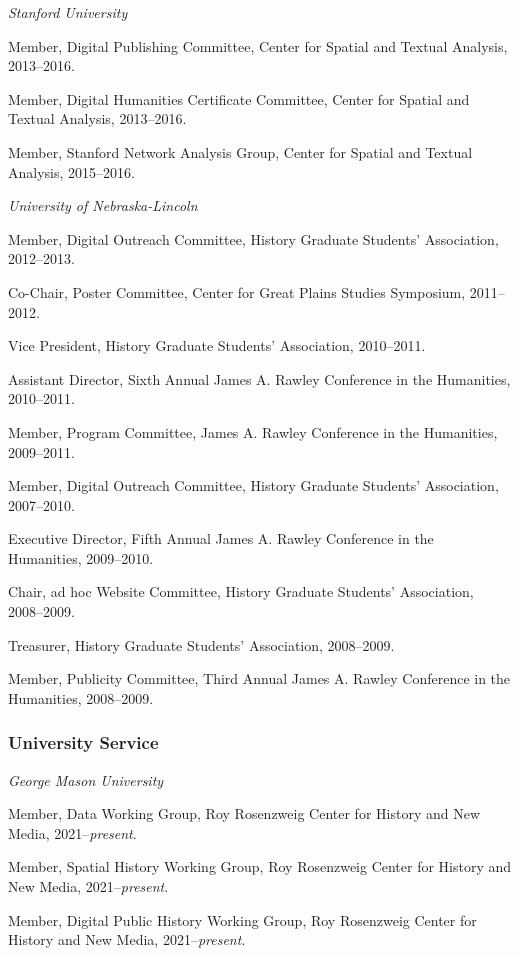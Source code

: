 \emph{Stanford University}

Member, Digital Publishing Committee, Center for Spatial and Textual
Analysis, 2013--2016.

Member, Digital Humanities Certificate Committee, Center for Spatial and
Textual Analysis, 2013--2016.

Member, Stanford Network Analysis Group, Center for Spatial and Textual
Analysis, 2015--2016.

\vspace{.4cm}

\emph{University of Nebraska-Lincoln}

Member, Digital Outreach Committee, History Graduate Students'
Association, 2012--2013.

Co-Chair, Poster Committee, Center for Great Plains Studies Symposium,
2011--2012.

Vice President, History Graduate Students' Association, 2010--2011.

Assistant Director, Sixth Annual James A. Rawley Conference in the
Humanities, 2010--2011.

Member, Program Committee, James A. Rawley Conference in the Humanities,
2009--2011.

Member, Digital Outreach Committee, History Graduate Students'
Association, 2007--2010.

Executive Director, Fifth Annual James A. Rawley Conference in the
Humanities, 2009--2010.

Chair, ad hoc Website Committee, History Graduate Students' Association,
2008--2009.

Treasurer, History Graduate Students' Association, 2008--2009.

Member, Publicity Committee, Third Annual James A. Rawley Conference in
the Humanities, 2008--2009.

\hypertarget{university-service}{%
\subsubsection{University Service}\label{university-service}}

\emph{George Mason University}

Member, Data Working Group, Roy Rosenzweig Center for History and New
Media, 2021--\emph{present}.

Member, Spatial History Working Group, Roy Rosenzweig Center for History
and New Media, 2021--\emph{present}.

Member, Digital Public History Working Group, Roy Rosenzweig Center for
History and New Media, 2021--\emph{present}.

